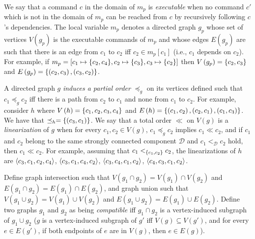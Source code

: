 We say that a command $c$ in the domain of $m_p$ is \emph{executable} when no command $c'$ which is not in the domain of $m_p$ can be reached from $c$ by recursively following $c$'s dependencies.
The local variable $m_p$ denotes a directed graph $g_p$ whose set of vertices $V\left( g_p \right)$ is the executable commands of $m_p$ and whose edges $E\left( g_p \right)$ are such that there is an edge from $c_1$ to $c_2$ iff $c_2 \in m_p\left[ c_1 \right]$ (i.e., $c_1$ depends on $c_2$). For example, if $m_p = \left[ c_1 \mapsto \aset{c_2,c_4}, c_2 \mapsto \aset{c_3}, c_3 \mapsto \aset{c_2}\right]$ then $V\left( g_p \right) = \left\{c_2,c_3\right\}$ and $E\left( g_p \right) = \left\{\left( c_2,c_3 \right),\left( c_3,c_2 \right)\right\}$.

A directed graph $g$ \emph{induces a partial order} $\preceq_g$ on its vertices defined such that $c_1 \preceq_g c_2$ iff there is a path from $c_2$ to $c_1$ and none from $c_1$ to $c_2$.
For example, consider $h$ where $V\left( h \right)=\left\{c_1,c_2,c_3,c_4\right\}$ and $E\left( h \right)=\left\{\left( c_1,c_2 \right),\left( c_2,c_1 \right),\left( c_1,c_3 \right)\right\}$. 
We have that $\preceq_h = \left\{\left( c_3,c_1 \right)\right\}$.
We say that a total order $\ll$ on $V\left( g \right)$ is a \emph{linearization} of $g$ when for every $c_1,c_2\in V\left( g \right)$, $c_1 \preceq_g c_2$ implies $c_1 \ll c_2$, and if $c_1$ and $c_2$ belong to the same strongly connected component $\mathcal{D}$ and $ c_1 <_{\mathcal{D}} c_2$ hold, then $c_1 \ll c_2$. For example, assuming that $c_1 <_{\left\{c_1,c_2\right\}} c_2$, the linearizations of $h$ are $\left\langle c_3,c_1,c_2,c_4\right\rangle$, $\left\langle c_3,c_1,c_4,c_2\right\rangle$, $\left\langle c_3,c_4,c_1,c_2\right\rangle$,
$\left\langle c_4,c_3,c_1,c_2\right\rangle$.

\begin{comment}
We now define a partial order on graphs. If $g_1$ and $g_2$ are two graphs, then we write $g_1 \leq g_2$ iff $V\left( g_1 \right)\subseteq V\left( g_2 \right)$, and if $v\in V\left( g_1 \right)$, $e\in E\left( g_2 \right)$, and $v$ is an endpoint of $e$, then $e\in E\left( g_1 \right)$. 
For example, consider the graphs $h'$ and $h''$ such that $V\left( h' \right)=\aset{c_1,c_2,c_4}$, $E\left( h' \right)=\aset{\left( c_1,c_2 \right),\left( c_2,c_1 \right)}$, $V\left( h'' \right)=\aset{c_1,c_3,c_4}$, and $E\left( h'' \right)=\aset{\left( c_1,c_3 \right)}$. We have that $h'\leq h$, but $ h''\not\leq h$.
\end{comment}

Define graph intersection such that $V\left( g_1 \cap g_2 \right)=V\left( g_1 \right)\cap V\left( g_2 \right)$ and $E\left( g_1 \cap g_2 \right)= E\left( g_1 \right)\cap E\left( g_2 \right)$, and graph union such that $V\left( g_1 \cup g_2 \right)=V\left( g_1 \right)\cup V\left( g_2 \right)$ and $E\left( g_1 \cup g_2 \right)= E\left( g_1 \right)\cup E\left( g_2 \right)$.
Define two graphs $g_1$ and $g_2$ as being \emph{compatible} iff $g_1 \cap g_2$ is a vertex-induced subgraph of $g_1 \cup g_2$ ($g$ is a vertex-induced subgraph of $g'$ iff $V\left( g \right)\subseteq V\left( g' \right)$, and for every $e\in E\left( g' \right)$, if both endpoints of $e$ are in $V\left( g \right)$, then $e\in E\left( g \right)$).

